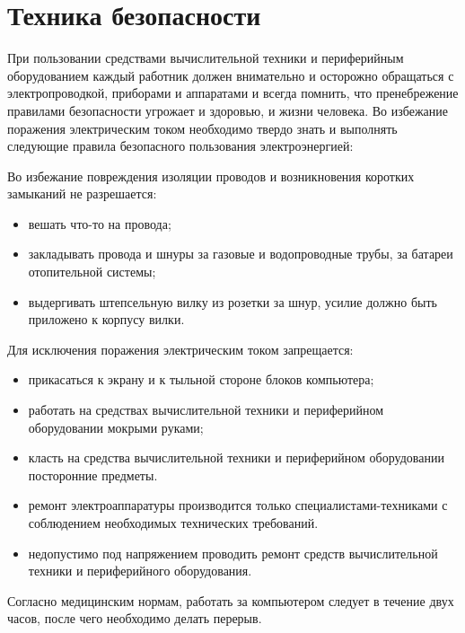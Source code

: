 \section*{Техника безопасности}

При пользовании средствами вычислительной техники и периферийным оборудованием каждый работник должен внимательно и осторожно обращаться с электропроводкой, приборами и аппаратами и всегда помнить, что пренебрежение правилами безопасности угрожает и здоровью, и жизни человека. Во избежание поражения электрическим током необходимо твердо знать и выполнять следующие правила безопасного пользования электроэнергией:

Во избежание повреждения изоляции проводов и возникновения коротких замыканий не разрешается:
\begin{itemize}
	\item вешать что-то на провода;
	\item закладывать провода и шнуры за газовые и водопроводные трубы, за батареи отопительной системы;
	\item выдергивать штепсельную вилку из розетки за шнур, усилие должно быть приложено к корпусу вилки.
\end{itemize}

Для исключения поражения электрическим током запрещается:
\begin{itemize}
	\item прикасаться к экрану и к тыльной стороне блоков компьютера; 
	\item работать на средствах вычислительной техники и периферийном оборудовании мокрыми руками; 
	\item класть на средства вычислительной техники и периферийном оборудовании посторонние предметы.
	\item ремонт электроаппаратуры производится только специалистами-техниками с соблюдением необходимых технических требований.
	\item недопустимо под напряжением проводить ремонт средств вычислительной техники и периферийного оборудования.	
\end{itemize}

Согласно медицинским нормам, работать за компьютером следует в течение двух часов, после чего необходимо делать перерыв.